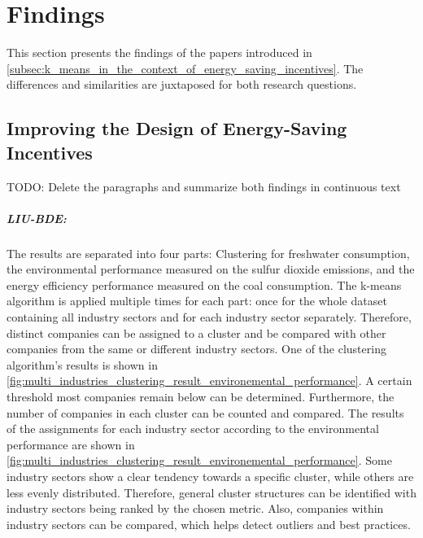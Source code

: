 \chapter{Findings}
\label{cha:findings}

This section presents the findings of the papers introduced in \autoref{subsec:k_means_in_the_context_of_energy_saving_incentives}.
The differences and similarities are juxtaposed for both research questions.

\section{Improving the Design of Energy-Saving Incentives}
\label{sec:improving_the_design_of_energy_saving_incentives}

TODO: Delete the paragraphs and summarize both findings in continuous text
\paragraph*{LIU-BDE:}
The results are separated into four parts: Clustering for freshwater consumption, the environmental performance measured on the sulfur dioxide emissions, and the energy efficiency performance measured on the coal consumption.
The k-means algorithm is applied multiple times for each part: once for the whole dataset containing all industry sectors and for each industry sector separately.
Therefore, distinct companies can be assigned to a cluster and be compared with other companies from the same or different industry sectors.
One of the clustering algorithm's results is shown in \autoref{fig:multi_industries_clustering_result_environemental_performance}.
A certain threshold most companies remain below can be determined.
Furthermore, the number of companies in each cluster can be counted and compared.
The results of the assignments for each industry sector according to the environmental performance are shown in \autoref{fig:multi_industries_clustering_result_environemental_performance}.
Some industry sectors show a clear tendency towards a specific cluster, while others are less evenly distributed.
Therefore, general cluster structures can be identified with industry sectors being ranked by the chosen metric.
Also, companies within industry sectors can be compared, which helps detect outliers and best practices.

